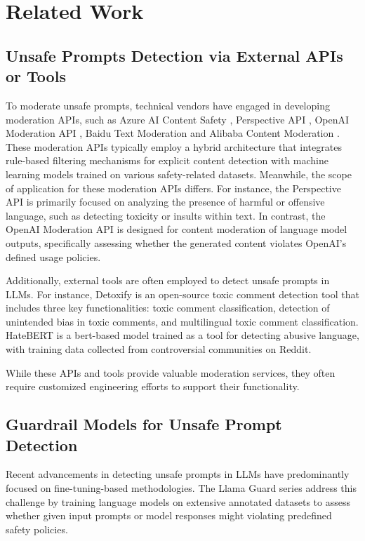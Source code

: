 \section{Related Work}
\subsection{Unsafe Prompts Detection via External APIs or Tools}
To moderate unsafe prompts, technical vendors have engaged in developing moderation APIs, such as Azure AI Content Safety \citep{azure_ai_content_safety_2024}, Perspective API \citep{perspective_api_2024}, OpenAI Moderation API \citep{openai_moderation_2024}, Baidu Text Moderation \citep{baidu_text_censoring} and Alibaba Content Moderation \citep{aliyun_image_audit}. These moderation APIs typically employ a hybrid architecture that integrates rule-based filtering mechanisms for explicit content detection with machine learning models trained on various safety-related datasets. Meanwhile, the scope of application for these moderation APIs differs. For instance, the Perspective API \citep{perspective_api_2024} is primarily focused on analyzing the presence of harmful or offensive language, such as detecting toxicity or insults within text. In contrast, the OpenAI Moderation API \citep{openai_moderation_2024} is designed for content moderation of language model outputs, specifically assessing whether the generated content violates OpenAI's defined usage policies.


Additionally, external tools are often employed to detect unsafe prompts in LLMs. For instance, Detoxify \citep{Detoxify} is an open-source toxic comment detection tool that includes three key functionalities: toxic comment classification, detection of unintended bias in toxic comments, and multilingual toxic comment classification. HateBERT \citep{caselli-etal-2021-hatebert} is a bert-based model trained as a tool for detecting abusive language, with training data collected from controversial communities on Reddit. 

While these APIs and tools provide valuable moderation services, they often require customized engineering efforts to support their functionality.

\subsection{Guardrail Models for Unsafe Prompt Detection}
Recent advancements in detecting unsafe prompts in LLMs have predominantly focused on fine-tuning-based methodologies. The Llama Guard series \citep{inan2023llama, dubey2024llama3herdmodels} address this challenge by training language models on extensive annotated datasets to assess whether given input prompts or model responses might violating predefined safety policies. 

